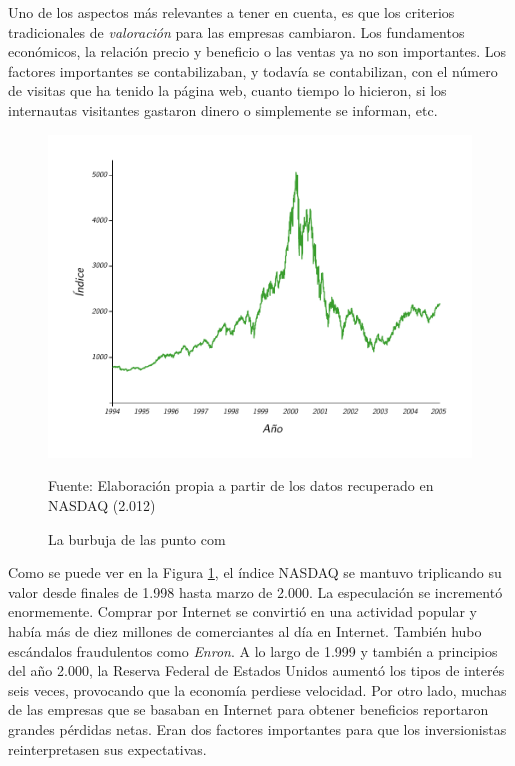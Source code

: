Uno de los aspectos más relevantes a tener en cuenta, es que los criterios tradicionales de \emph{valoración} para las empresas cambiaron. Los fundamentos económicos, la relación precio y beneficio o las ventas ya no son importantes. Los factores importantes se contabilizaban, y todavía se contabilizan, con el número de visitas que ha tenido la página web, cuanto tiempo lo hicieron, si los internautas visitantes gastaron dinero o simplemente se informan, etc.

\begin{figure}[!h] 
\caption{La burbuja de las punto com} 
\centering \includegraphics[width=150mm]{capitulos/graficos/comBubble} 
\label{fig:La burbuja de las punto com} 

	\footnotesize
	Fuente: Elaboración propia a partir de los datos recuperado en NASDAQ (2.012)

\end{figure}

Como se puede ver en la Figura \ref{fig:La burbuja de las punto com}, el índice NASDAQ se mantuvo triplicando su valor desde finales de 1.998 hasta marzo de 2.000. La especulación se incrementó enormemente. Comprar por Internet se convirtió en una actividad popular y había más de diez millones de comerciantes al día en Internet. También hubo escándalos fraudulentos como \emph{Enron}. A lo largo de 1.999 y también a principios del año 2.000, la Reserva Federal de Estados Unidos aumentó los tipos de interés seis veces, provocando que la economía perdiese velocidad. Por otro lado, muchas de las empresas que se basaban en Internet para obtener beneficios reportaron grandes pérdidas netas. Eran dos factores importantes para que los inversionistas reinterpretasen sus expectativas.

